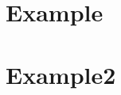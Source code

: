 \documentclass[letterpaper]{article}
\begin{document}




\setcounter{secnumdepth}{1}
\section{Example}
\section{Example2}
\tableofcontents
\end{document}
